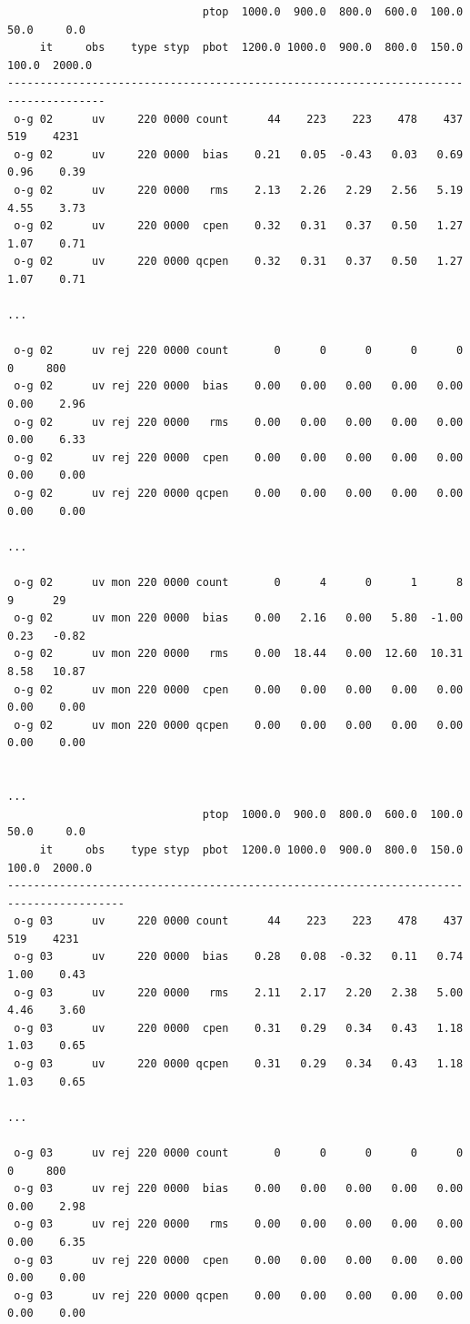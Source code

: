 \begin{scriptsize}
\begin{verbatim}
                              ptop  1000.0  900.0  800.0  600.0  100.0   50.0     0.0
     it     obs    type styp  pbot  1200.0 1000.0  900.0  800.0  150.0  100.0  2000.0
-------------------------------------------------------------------------------------
 o-g 02      uv     220 0000 count      44    223    223    478    437    519    4231
 o-g 02      uv     220 0000  bias    0.21   0.05  -0.43   0.03   0.69   0.96    0.39
 o-g 02      uv     220 0000   rms    2.13   2.26   2.29   2.56   5.19   4.55    3.73
 o-g 02      uv     220 0000  cpen    0.32   0.31   0.37   0.50   1.27   1.07    0.71
 o-g 02      uv     220 0000 qcpen    0.32   0.31   0.37   0.50   1.27   1.07    0.71

...

 o-g 02      uv rej 220 0000 count       0      0      0      0      0      0     800
 o-g 02      uv rej 220 0000  bias    0.00   0.00   0.00   0.00   0.00   0.00    2.96
 o-g 02      uv rej 220 0000   rms    0.00   0.00   0.00   0.00   0.00   0.00    6.33
 o-g 02      uv rej 220 0000  cpen    0.00   0.00   0.00   0.00   0.00   0.00    0.00
 o-g 02      uv rej 220 0000 qcpen    0.00   0.00   0.00   0.00   0.00   0.00    0.00

...

 o-g 02      uv mon 220 0000 count       0      4      0      1      8      9      29
 o-g 02      uv mon 220 0000  bias    0.00   2.16   0.00   5.80  -1.00   0.23   -0.82
 o-g 02      uv mon 220 0000   rms    0.00  18.44   0.00  12.60  10.31   8.58   10.87
 o-g 02      uv mon 220 0000  cpen    0.00   0.00   0.00   0.00   0.00   0.00    0.00
 o-g 02      uv mon 220 0000 qcpen    0.00   0.00   0.00   0.00   0.00   0.00    0.00


...
                              ptop  1000.0  900.0  800.0  600.0  100.0   50.0     0.0
     it     obs    type styp  pbot  1200.0 1000.0  900.0  800.0  150.0  100.0  2000.0
----------------------------------------------------------------------------------------
 o-g 03      uv     220 0000 count      44    223    223    478    437    519    4231
 o-g 03      uv     220 0000  bias    0.28   0.08  -0.32   0.11   0.74   1.00    0.43
 o-g 03      uv     220 0000   rms    2.11   2.17   2.20   2.38   5.00   4.46    3.60
 o-g 03      uv     220 0000  cpen    0.31   0.29   0.34   0.43   1.18   1.03    0.65
 o-g 03      uv     220 0000 qcpen    0.31   0.29   0.34   0.43   1.18   1.03    0.65

...

 o-g 03      uv rej 220 0000 count       0      0      0      0      0      0     800
 o-g 03      uv rej 220 0000  bias    0.00   0.00   0.00   0.00   0.00   0.00    2.98
 o-g 03      uv rej 220 0000   rms    0.00   0.00   0.00   0.00   0.00   0.00    6.35
 o-g 03      uv rej 220 0000  cpen    0.00   0.00   0.00   0.00   0.00   0.00    0.00
 o-g 03      uv rej 220 0000 qcpen    0.00   0.00   0.00   0.00   0.00   0.00    0.00


\end{verbatim}
\end{scriptsize}
